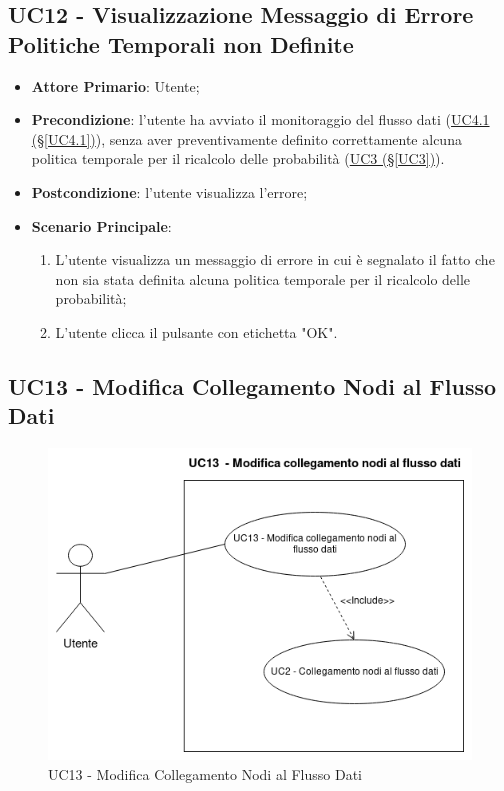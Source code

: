 \pagebreak

\subsection{UC12 - Visualizzazione Messaggio di Errore Politiche Temporali non Definite}\label{UC12}
\begin{itemize}
\item \textbf{Attore Primario}: Utente;
\item \textbf{Precondizione}: l'utente ha avviato il monitoraggio del flusso dati (\hyperref[UC4.1]{UC4.1 							(§\ref*{UC4.1})}), senza aver preventivamente definito correttamente alcuna politica temporale per il ricalcolo delle probabilità (\hyperref[UC3]{UC3 (§\ref*{UC3})}).
\item \textbf{Postcondizione}: l'utente visualizza l'errore;
\item \textbf{Scenario Principale}: 
	\begin{enumerate}
	\item L'utente visualizza un messaggio di errore in cui è segnalato il fatto che non sia stata definita alcuna 				politica temporale per il ricalcolo delle probabilità;
	\item L'utente clicca il pulsante con etichetta "OK".
	\end{enumerate}
\end{itemize}

\pagebreak

\subsection{UC13 - Modifica Collegamento Nodi al Flusso Dati}\label{UC13}

\begin{figure}[H]
\centering
\includegraphics[scale=0.6]{./images/UC13.png}
\caption{UC13 - Modifica Collegamento Nodi al Flusso Dati}
\end{figure}


